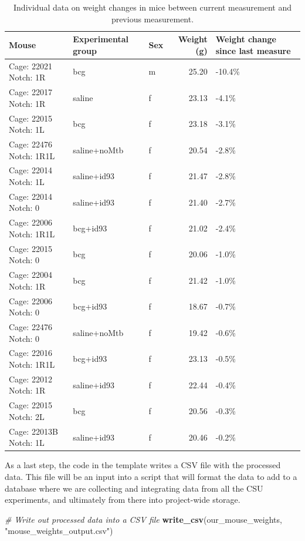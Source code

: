 \documentclass[
]{book}
\newenvironment{Shaded}{\begin{snugshade}}{\end{snugshade}}
\newcommand{\CommentTok}[1]{\textcolor[rgb]{0.56,0.35,0.01}{\textit{#1}}}
\newcommand{\FunctionTok}[1]{\textcolor[rgb]{0.13,0.29,0.53}{\textbf{#1}}}
\newcommand{\NormalTok}[1]{#1}
\newcommand{\StringTok}[1]{\textcolor[rgb]{0.31,0.60,0.02}{#1}}
\begin{document}
\begin{table}

\caption{\label{tab:unnamed-chunk-18}Individual data on weight changes in mice between current measurement and previous measurement.}
\centering
\begin{tabular}[t]{l|l|l|r|l}
\hline
Mouse & Experimental group & Sex & Weight (g) & Weight change since last measure\\
\hline
Cage: 22021 Notch: 1R & bcg & m & 25.20 & -10.4\%\\
\hline
Cage: 22017 Notch: 1R & saline & f & 23.13 & -4.1\%\\
\hline
Cage: 22015 Notch: 1L & bcg & f & 23.18 & -3.1\%\\
\hline
Cage: 22476 Notch: 1R1L & saline+noMtb & f & 20.54 & -2.8\%\\
\hline
Cage: 22014 Notch: 1L & saline+id93 & f & 21.47 & -2.8\%\\
\hline
Cage: 22014 Notch: 0 & saline+id93 & f & 21.40 & -2.7\%\\
\hline
Cage: 22006 Notch: 1R1L & bcg+id93 & f & 21.02 & -2.4\%\\
\hline
Cage: 22015 Notch: 0 & bcg & f & 20.06 & -1.0\%\\
\hline
Cage: 22004 Notch: 1R & bcg & f & 21.42 & -1.0\%\\
\hline
Cage: 22006 Notch: 0 & bcg+id93 & f & 18.67 & -0.7\%\\
\hline
Cage: 22476 Notch: 0 & saline+noMtb & f & 19.42 & -0.6\%\\
\hline
Cage: 22016 Notch: 1R1L & bcg+id93 & f & 23.13 & -0.5\%\\
\hline
Cage: 22012 Notch: 1R & saline+id93 & f & 22.44 & -0.4\%\\
\hline
Cage: 22015 Notch: 2L & bcg & f & 20.56 & -0.3\%\\
\hline
Cage: 22013B Notch: 1L & saline+id93 & f & 20.46 & -0.2\%\\
\hline
\end{tabular}
\end{table}

As a last step, the code in the template writes a CSV file with the processed
data. This file will be an input into a script that will format the data to
add to a database where we are collecting and integrating data from all the CSU
experiments, and ultimately from there into project-wide storage.

\begin{Shaded}
\begin{Highlighting}[]
\CommentTok{\# Write out processed data into a CSV file}
\FunctionTok{write\_csv}\NormalTok{(our\_mouse\_weights, }\StringTok{"mouse\_weights\_output.csv"}\NormalTok{)}
\end{Highlighting}
\end{Shaded}
\end{document}
